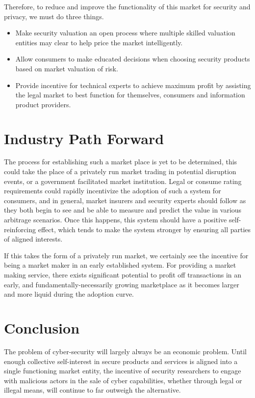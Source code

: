 \documentclass[conference]{IEEEtran}
\begin{document}
Therefore, to reduce and improve the functionality of this market for security and privacy, we must do three things.

\begin{itemize}
\item Make security valuation an open process where multiple skilled valuation entities may clear to help price the market intelligently.
\item Allow consumers to make educated decisions when choosing security products based on market valuation of risk.
\item Provide incentive for technical experts to achieve maximum profit by assisting the legal market to best function for themselves, consumers and information product providers.
\end{itemize}

\section{Industry Path Forward}
The process for establishing such a market place is yet to be determined, this could take the place of a privately run market trading in potential disruption events, or a government facilitated market institution.   Legal or consume rating requirements could rapidly incentivize the adoption of such a system for consumers, and in general, market insurers and security experts should follow as they both begin to see and be able to measure and predict the value in various arbitrage scenarios.   Once this happens, this system should have a positive self-reinforcing effect, which tends to make the system stronger by ensuring all parties of aligned interests.

If this takes the form of a privately run market, we certainly see the incentive for being a market maker in an early established system.   For providing a market making service, there exists significant potential to profit off transactions in an early, and fundamentally-necessarily growing marketplace as it becomes larger and more liquid during the adoption curve.

\section{Conclusion}

The problem of cyber-security will largely always be an economic problem.  Until enough collective self-interest in secure products and services is aligned into a single functioning market entity, the incentive of security researchers to engage with malicious actors in the sale of cyber capabilities, whether through legal or illegal means, will continue to far outweigh the alternative.  
\end{document}
